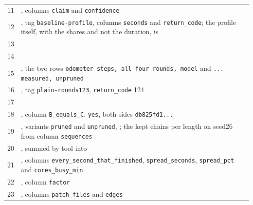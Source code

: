 \begin{xltabular}{\textwidth}{rX}
11 & \protect{}, columns \texttt{claim} and \texttt{confidence} \\
12 & \protect{}, tag \texttt{baseline-\allowbreak{}profile}, columns \texttt{seconds} and
\texttt{return\_\allowbreak{}\allowbreak{}code}; the profile itself, with the shares and not the duration, is \protect{} \\
13 & \protect{} \\
14 & \protect{} \\
15 & \protect{}, the two rows
\texttt{odometer steps,\allowbreak{} all four rounds,\allowbreak{} model} and \texttt{.\allowbreak{}.\allowbreak{}.\allowbreak{} measured,\allowbreak{} unpruned} \\
16 & \protect{}, tag \texttt{plain-\allowbreak{}rounds123}, \texttt{return\_\allowbreak{}\allowbreak{}code}
124 \\
17 & \protect{} \\
18 & \protect{}, column \texttt{B\_\allowbreak{}\allowbreak{}equals\_\allowbreak{}\allowbreak{}C}, \texttt{yes}, both
sides \texttt{db825fd1.\allowbreak{}.\allowbreak{}.\allowbreak{}} \\
19 & \protect{}, variants \texttt{pruned} and \texttt{unpruned},
\protect{}; the kept chains per length on seed26 from column \texttt{sequences} \\
20 & \protect{}, summed by tool into
\protect{} \\
21 & \protect{}, columns \texttt{every\_\allowbreak{}\allowbreak{}second\_\allowbreak{}\allowbreak{}that\_\allowbreak{}\allowbreak{}finished},
\texttt{spread\_\allowbreak{}\allowbreak{}seconds}, \texttt{spread\_\allowbreak{}\allowbreak{}pct} and \texttt{cores\_\allowbreak{}\allowbreak{}busy\_\allowbreak{}\allowbreak{}min} \\
22 & \protect{}, column \texttt{factor} \\
23 & \protect{}, columns \texttt{patch\_\allowbreak{}\allowbreak{}files} and \texttt{edges} \\

\end{xltabular}
